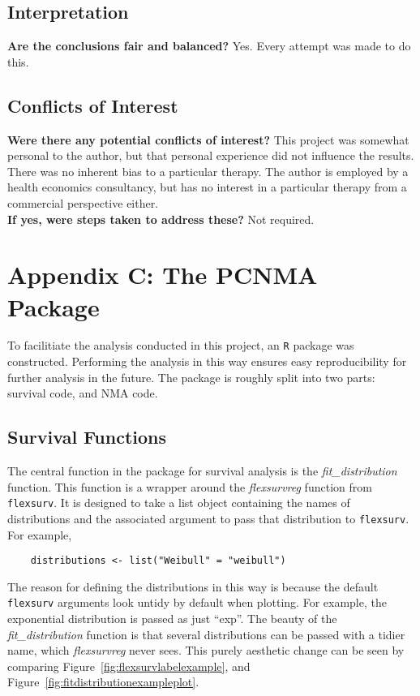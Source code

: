 \subsection{Interpretation}

\textbf{Are the conclusions fair and balanced?} Yes. Every attempt was made to do this. \\

\subsection{Conflicts of Interest}

\textbf{Were there any potential conflicts of interest?} This project was somewhat personal to the author, but that personal experience did not influence the results. There was no inherent bias to a particular therapy. The author is employed by a health economics consultancy, but has no interest in a particular therapy from a commercial perspective either.\\

\textbf{If yes, were steps taken to address these?} Not required.

\section{Appendix C: The PCNMA Package}\label{pack}

To facilitiate the analysis conducted in this project, an \verb|R| package was constructed. Performing the analysis in this way ensures easy reproducibility for further analysis in the future. The package is roughly split into two parts: survival code, and NMA code. 

\subsection{Survival Functions}
The central function in the package for survival analysis is the \textit{fit\_distribution} function. This function is a wrapper around the \textit{flexsurvreg} function from \verb|flexsurv|. It is designed to take a list object containing the names of distributions and the associated argument to pass that distribution to \verb|flexsurv|. For example, 

\begin{lstlisting}
    distributions <- list("Weibull" = "weibull")
\end{lstlisting}

The reason for defining the distributions in this way is because the default \verb|flexsurv| arguments look untidy by default when plotting. For example, the exponential distribution is passed as just ``exp''. The beauty of the \textit{fit\_distribution} function is that several distributions can be passed with a tidier name, which \textit{flexsurvreg} never sees. This purely aesthetic change can be seen by comparing Figure~\ref{fig:flexsurvlabelexample}, and Figure~\ref{fig:fitdistributionexampleplot}. \\

